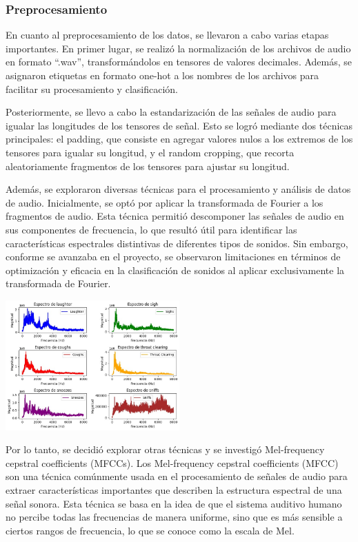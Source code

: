 \subsubsection{Preprocesamiento}

En cuanto al preprocesamiento de los datos, se llevaron a cabo varias etapas importantes. En primer lugar, se realizó la normalización de los archivos de audio en formato ``.wav'', transformándolos en tensores de valores decimales. Además, se asignaron etiquetas en formato one-hot a los nombres de los archivos para facilitar su procesamiento y clasificación.

Posteriormente, se llevo a cabo la estandarización de las señales de audio para igualar las longitudes de los tensores de señal. Esto se logró mediante dos técnicas principales: el padding, que consiste en agregar valores nulos a los extremos de los tensores para igualar su longitud, y el random cropping, que recorta aleatoriamente fragmentos de los tensores para ajustar su longitud.

Además, se exploraron diversas técnicas para el procesamiento y análisis de datos de audio. Inicialmente, se optó por aplicar la transformada de Fourier a los fragmentos de audio. Esta técnica permitió descomponer las señales de audio en sus componentes de frecuencia, lo que resultó útil para identificar las características espectrales distintivas de diferentes tipos de sonidos. Sin embargo, conforme se avanzaba en el proyecto, se observaron limitaciones en términos de optimización y eficacia en la clasificación de sonidos al aplicar exclusivamente la transformada de Fourier. 


\begin{center}
    \includegraphics[width=0.5\textwidth]{ImagenesLatex/fourier.jpg}
\end{center}


Por lo tanto, se decidió explorar otras técnicas y se investigó Mel-frequency cepstral coefficients (MFCCs).
Los Mel-frequency cepstral coefficients (MFCC) son una técnica comúnmente usada en el procesamiento de señales de audio para extraer características importantes que describen la estructura espectral de una señal sonora. Esta técnica se basa en la idea de que el sistema auditivo humano no percibe todas las frecuencias de manera uniforme, sino que es más sensible a ciertos rangos de frecuencia, lo que se conoce como la escala de Mel.


